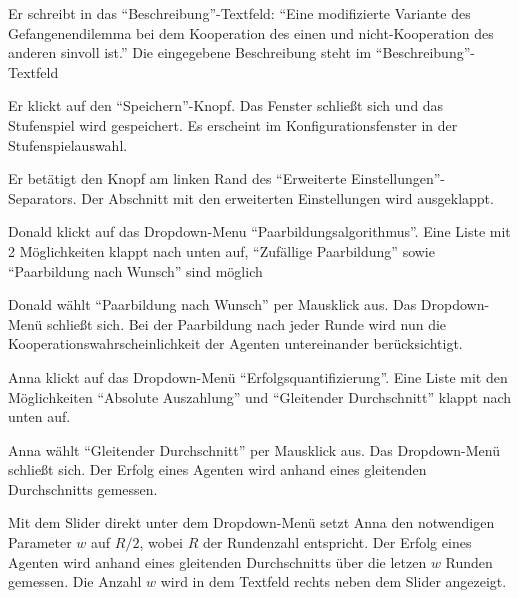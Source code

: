 \documentclass[parskip=full,11pt]{scrartcl}
\begin{document}
{Er schreibt in das \enquote{Beschreibung}-Textfeld: \enquote{Eine modifizierte Variante des Gefangenendilemma bei dem Kooperation des einen und nicht-Kooperation des anderen sinvoll ist.}}
{Die eingegebene Beschreibung steht im \enquote{Beschreibung}-Textfeld}

{Er klickt auf den \enquote{Speichern}-Knopf.}
{Das Fenster schließt sich und das Stufenspiel wird gespeichert. Es erscheint im Konfigurationsfenster in der Stufenspielauswahl.}


{Er betätigt den Knopf am linken Rand des \enquote{Erweiterte Einstellungen}-Separators.}
{Der Abschnitt mit den erweiterten Einstellungen wird ausgeklappt.}

{Donald klickt auf das Dropdown-Menu \enquote{Paarbildungsalgorithmus}.}
{Eine Liste mit 2 Möglichkeiten klappt nach unten auf, \enquote{Zufällige Paarbildung} sowie \enquote{Paarbildung nach Wunsch} sind möglich}

{Donald wählt  \enquote{Paarbildung nach Wunsch} per Mausklick aus.}
{Das Dropdown-Menü schließt sich. Bei der Paarbildung nach jeder Runde wird nun die Kooperationswahrscheinlichkeit der Agenten untereinander berücksichtigt.}


{Anna klickt auf das Dropdown-Menü \enquote{Erfolgsquantifizierung}.}
{Eine Liste mit den Möglichkeiten \enquote{Absolute Auszahlung} und  \enquote{Gleitender Durchschnitt} klappt nach unten auf.}

{Anna wählt \enquote{Gleitender Durchschnitt} per Mausklick aus.}
{Das Dropdown-Menü schließt sich. Der Erfolg eines Agenten wird anhand eines gleitenden Durchschnitts gemessen.}

{Mit dem Slider direkt unter dem Dropdown-Menü setzt Anna den notwendigen Parameter \(w\) auf \(R/2\), wobei \(R\) der Rundenzahl entspricht.}
{Der Erfolg eines Agenten wird anhand eines gleitenden Durchschnitts über die letzen \(w\) Runden gemessen. Die Anzahl \(w\) wird in dem Textfeld rechts neben dem Slider angezeigt.}
\end{document}
